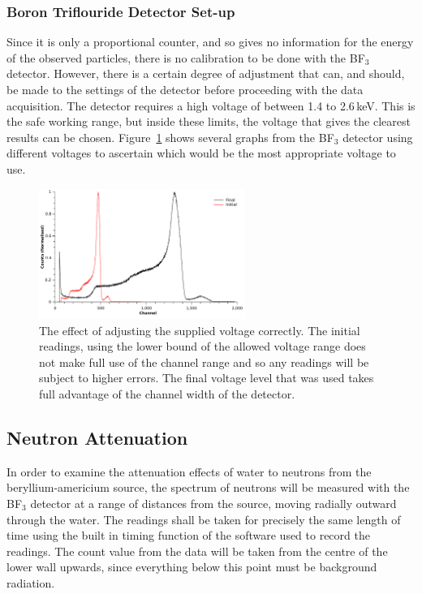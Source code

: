 \subsubsection{Boron Triflouride Detector Set-up} %
\label{ssub:boron_triflouride_detector_set_up}
Since it is only a proportional counter, and so gives no information for the energy of the observed particles, there is no calibration to be done with the BF$_3$ detector. However, there is a certain degree of adjustment that can, and should, be made to the settings of the detector before proceeding with the data acquisition. The detector requires a high voltage of between 1.4 to 2.6\,keV. This is the safe working range, but inside these limits, the voltage that gives the clearest results can be chosen. Figure~\ref{fig:bf3voltages} shows several graphs from the BF$_3$ detector using different voltages to ascertain which would be the most appropriate voltage to use.
\begin{figure}[ht]
  \centering
  \includegraphics[width=0.6\textwidth]{BF3_calib_voltage.pdf}
  \caption{The effect of adjusting the supplied voltage correctly. The initial readings, using the lower bound of the allowed voltage range does not make full use of the channel range and so any readings will be subject to higher errors. The final voltage level that was used takes full advantage of the channel width of the detector. \label{fig:bf3voltages}}
\end{figure}

\subsection{Neutron Attenuation} %
\label{sub:neutron_attenuation}In order to examine the attenuation effects of water to neutrons from the beryllium-americium source, the spectrum of neutrons will be measured with the BF$_3$ detector at a range of distances from the source, moving radially outward through the water. The readings shall be taken for precisely the same length of time using the built in timing function of the software used to record the readings. The count value from the data will be taken from the centre of the lower wall upwards, since everything below this point must be background radiation.


